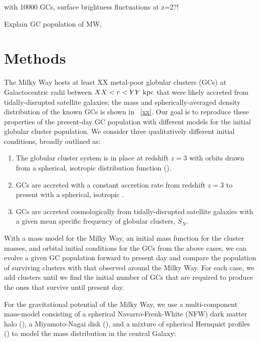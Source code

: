 \documentclass[letterpaper,12pt,preprint]{aastex}
\begin{document}
with 10000 GCs, surface brightness fluctuations at z=2?!

Explain GC population of MW,

\section{Methods}\label{sec:methods}

The Milky Way hosts at least XX metal-poor globular clusters (GCs) at
Galactocentric radii between $XX < r < YY~\mathrm{kpc}$ that were likely accreted from
tidally-disrupted satellite galaxies;
the mass and spherically-averaged density distribution of the known GCs is shown
in \figname~\ref{xx}.
Our goal is to reproduce these properties of the present-day GC population with
different models for the initial globular cluster population.
We consider three qualitatively different initial conditions, broadly outlined
as:
\begin{enumerate}
  \item The globular cluster system is in place at redshift $z=3$ with orbits
    drawn from a spherical, isotropic distribution function ().
  \item GCs are accreted with a constant accretion rate from redshift $z=3$ to
    present with a spherical, isotropic .
  \item GCs are accreted cosmologically from tidally-disrupted satellite
    galaxies with a given mean specific frequency of globular clusters, $S_N$.
\end{enumerate}
With a mass model for the Milky Way, an initial mass function for the cluster
masses, and orbital initial conditions for the GCs from the above cases, we can
evolve a given GC population forward to present day and compare the population
of surviving clusters with that observed around the Milky Way.
For each case, we add clusters until we find the initial number of GCs that are
required to produce the ones that survive until present day.

For the gravitational potential of the Milky Way, we use a multi-component
mass-model consisting of a spherical Navarro-Frenk-White (NFW) dark matter halo
(\citealt{Navarro:1996}), a Miyamoto-Nagai disk (\citealt{Miyamoto:1975}), and a
mixture of spherical Hernquist profiles (\citealt{Hernquist:1990}) to model the
mass distribution in the central Galaxy:
\begin{align}

\end{align}
\end{document}
